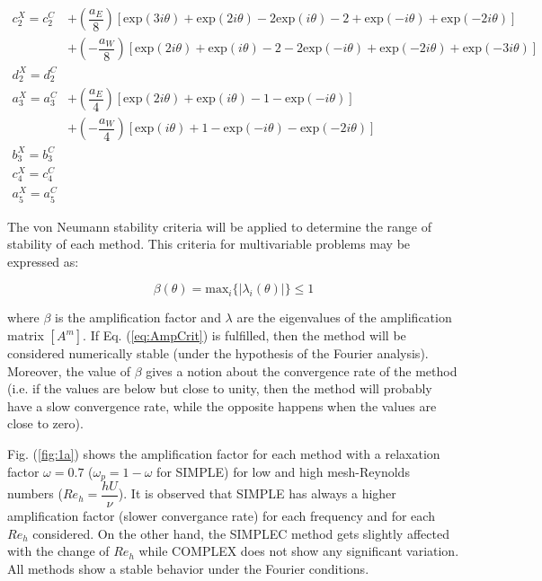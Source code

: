 \documentclass[final,3p,times,10pt,onecolumn]{myElsarticle}
\numberwithin{equation}{section}
\begin{document}
\begin{equation}
\begin{split}
     c^X_2 = c_2^C &+ \left(\dfrac{a_E}{8}\right) \left[\text{exp} (3 i \theta) + \text{exp} (2 i \theta) - 2 \text{exp} (i \theta) - 2 + \text{exp} (-i \theta) + \text{exp} (-2 i \theta)\right] \\
     &+ \left(-\dfrac{a_W}{8}\right) \left[\text{exp} (2 i \theta) + \text{exp} (i \theta) - 2 - 2 \text{exp} (-i \theta) + \text{exp} (-2 i \theta) + \text{exp} (-3 i \theta)\right] \\
     d^X_2 = d^C_2& \\
     a^X_3 = a^C_3 &+ \left(\dfrac{a_E}{4}\right) \left[\text{exp} (2 i \theta) + \text{exp} (i \theta) - 1 - \text{exp} (-i \theta) \right] \\
     &+ \left(-\dfrac{a_W}{4}\right) \left[\text{exp} (i \theta) + 1 - \text{exp} (- i \theta) - \text{exp} (-2 i \theta) \right] \\
     b^X_3 = b_3^C& \\ 
     c^X_4 = c^C_4& \\
     a^X_5 = a^C_5&     
\end{split}
\end{equation}

The von Neumann stability criteria \cite{hirsch} will be applied to determine the range of stability of each method. This criteria for multivariable problems may be expressed as:

\begin{equation}
\beta(\theta) = \text{max}_i \{ |\lambda_i(\theta)| \} \leq 1
\label{eq:AmpCrit}
\end{equation}

\noindent where $\beta$ is the amplification factor and $\lambda$ are the eigenvalues of the amplification matrix $[A^m]$. If Eq. (\ref{eq:AmpCrit}) is fulfilled, then the method will be considered numerically stable (under the hypothesis of the Fourier analysis). Moreover, the value of $\beta$ gives a notion about the convergence rate of the method (i.e. if the values are below but close to unity, then the method will probably have a slow convergence rate, while the opposite happens when the values are close to zero).

Fig. (\ref{fig:1a}) shows the amplification factor for each method with a relaxation factor $\omega=0.7$ ($\omega_p=1-\omega$ for SIMPLE) for low and high mesh-Reynolds numbers ($Re_h = \dfrac{h U}{\nu}$). It is observed that SIMPLE has always a higher amplification factor (slower convergance rate) for each frequency and for each $Re_h$ considered. On the other hand, the SIMPLEC method gets slightly affected with the change of $Re_h$ while COMPLEX does not show any significant variation. All methods show a stable behavior under the Fourier conditions. 
\end{document}
